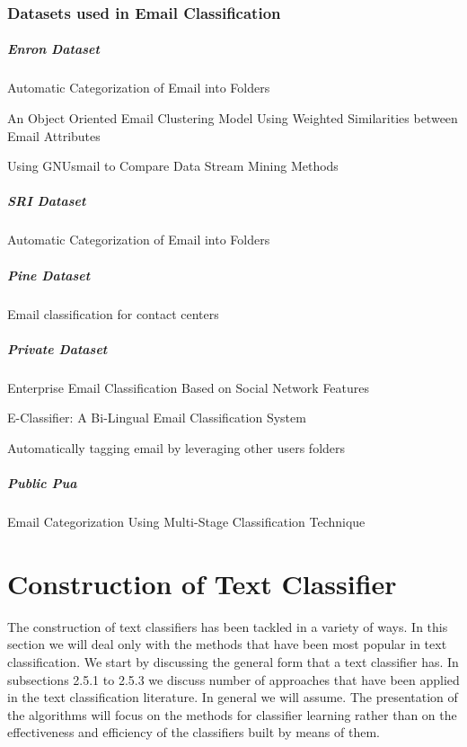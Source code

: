 \subsubsection{Datasets used in Email Classification}
\subparagraph{Enron Dataset}
    \begin{my_itemize}
        \item Automatic Categorization of Email into Folders \cite{RON04}
        \item An Object Oriented Email Clustering Model Using  Weighted Similarities 
  between Email Attributes \cite{NARESH10}
        \item Using GNUsmail to Compare Data Stream Mining Methods \cite{JOSE11}
    \end{my_itemize}
\subparagraph{SRI Dataset}
    \begin{my_itemize}
        \item Automatic Categorization of Email into Folders \cite{RON04}
    \end{my_itemize}
\subparagraph{Pine Dataset}
    \begin{my_itemize}
        \item Email classification for contact centers \cite{ANI03}
    \end{my_itemize}
\subparagraph{Private Dataset}
    \begin{my_itemize}
        \item Enterprise Email Classification Based on Social Network Features \cite{MIN11}
        \item E-Classifier: A Bi-Lingual Email Classification System \cite{NOUF08} 
        \item Automatically tagging email by leveraging other users folders \cite{YEHUDA11}
    \end{my_itemize}
\subparagraph{Public Pua}
    \begin{my_itemize}
        \item Email Categorization Using Multi-Stage Classification Technique \cite{MD07}
    \end{my_itemize}

\section{Construction of Text Classifier}
The construction of text classifiers has been tackled in a variety of ways.
In this section we will deal only with the methods that have been most popular in text classification. We start by discussing the general form that a text classifier has.  In subsections 2.5.1 to 2.5.3 we discuss number of approaches that have been applied in the text classification literature. In general we will assume. The presentation of the algorithms will focus on the methods for classifier learning rather than on the effectiveness and efficiency of the classifiers built by means of them.\cite{Sebastiani2002}

